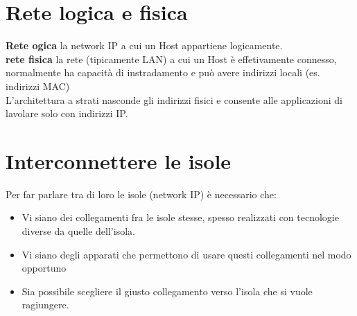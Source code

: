 \documentclass{report}
\begin{document}
            \section{Rete logica e fisica}
                \textbf{Rete ogica} la network IP a cui un Host appartiene logicamente.
                \\
                \textbf{rete fisica} la rete (tipicamente LAN) a cui un Host è effetivamente connesso, normalmente ha capacità di instradamento e può avere indirizzi locali (es. indirizzi MAC)
                \\
                L'architettura a strati nasconde gli indirizzi fisici e consente alle applicazioni di lavolare solo con indirizzi IP.
            \section{Interconnettere le isole}
                Per far parlare tra di loro le isole (network IP) è necessario che:
                \begin{itemize}
                    \item Vi siano dei collegamenti fra le isole stesse, spesso realizzati con tecnologie diverse da quelle dell'isola.
                    \item Vi siano degli apparati che permettono di usare questi collegamenti nel modo opportuno
                    \item Sia possibile scegliere il giusto collegamento verso l'isola che si vuole ragiungere.
                \end{itemize}
\end{document}
